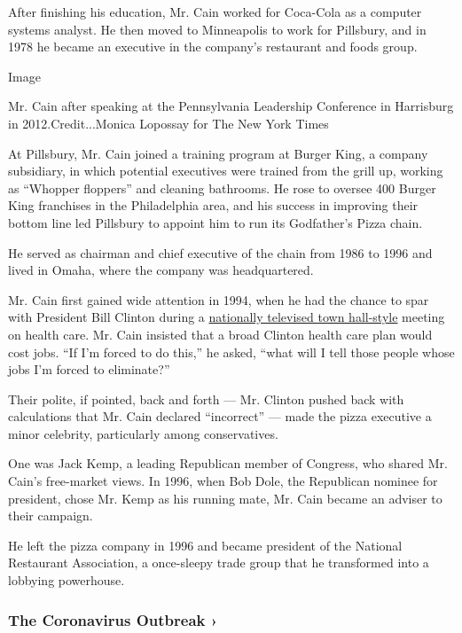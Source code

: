 After finishing his education, Mr. Cain worked for Coca-Cola as a
computer systems analyst. He then moved to Minneapolis to work for
Pillsbury, and in 1978 he became an executive in the company's
restaurant and foods group.

Image

Mr. Cain after speaking at the Pennsylvania Leadership Conference in
Harrisburg in 2012.Credit...Monica Lopossay for The New York Times

At Pillsbury, Mr. Cain joined a training program at Burger King, a
company subsidiary, in which potential executives were trained from the
grill up, working as ``Whopper floppers'' and cleaning bathrooms. He
rose to oversee 400 Burger King franchises in the Philadelphia area, and
his success in improving their bottom line led Pillsbury to appoint him
to run its Godfather's Pizza chain.

He served as chairman and chief executive of the chain from 1986 to 1996
and lived in Omaha, where the company was headquartered.

Mr. Cain first gained wide attention in 1994, when he had the chance to
spar with President Bill Clinton during a
\href{http://www.youtube.com/watch?v=-WP5dYfBBzU}{nationally televised
town hall-style} meeting on health care. Mr. Cain insisted that a broad
Clinton health care plan would cost jobs. ``If I'm forced to do this,''
he asked, ``what will I tell those people whose jobs I'm forced to
eliminate?''

Their polite, if pointed, back and forth --- Mr. Clinton pushed back
with calculations that Mr. Cain declared ``incorrect'' --- made the
pizza executive a minor celebrity, particularly among conservatives.

One was Jack Kemp, a leading Republican member of Congress, who shared
Mr. Cain's free-market views. In 1996, when Bob Dole, the Republican
nominee for president, chose Mr. Kemp as his running mate, Mr. Cain
became an adviser to their campaign.

He left the pizza company in 1996 and became president of the National
Restaurant Association, a once-sleepy trade group that he transformed
into a lobbying powerhouse.

\href{https://www.nytimes3xbfgragh.onion/news-event/coronavirus?action=click\&pgtype=Article\&state=default\&region=MAIN_CONTENT_3\&context=storylines_faq}{}

\hypertarget{the-coronavirus-outbreak-}{%
\subsubsection{The Coronavirus Outbreak
›}\label{the-coronavirus-outbreak-}}

